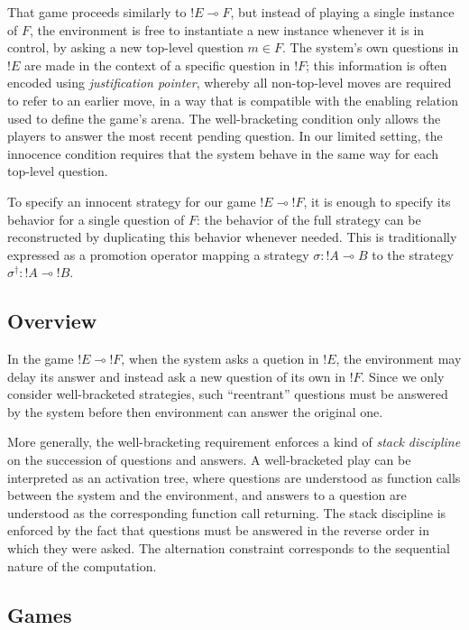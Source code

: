 \documentclass[format=sigplan,authordraft]{acmart}
\begin{document}
That game proceeds similarly to ${!E} \multimap F$,
but instead of playing a single instance of $F$,
the environment is free to instantiate a new instance
whenever it is in control,
by asking a new top-level question $m \in F$.
The system's own questions in ${!E}$
are made in the context of a specific question in ${!F}$;
this information is often encoded using \emph{justification pointer},
whereby all non-top-level moves are required to refer to
an earlier move,
in a way that is compatible with the enabling relation
used to define the game's arena.
The well-bracketing condition only allows the players
to answer the most recent pending question.
In our limited setting,
the innocence condition requires that the system
behave in the same way for each top-level question.

To specify an innocent strategy
for our game ${!E} \multimap {!F}$,
it is enough to specify its behavior
for a single question of $F$:
the behavior of the full strategy can be reconstructed
by duplicating this behavior whenever needed.
This is traditionally expressed as a promotion operator
mapping a strategy $\sigma : {!A} \multimap B$
to the strategy $\sigma^\dagger : {!A} \multimap {!B}$.


\subsection{Overview} %
\label{sec:arrow}

In the game ${!E} \multimap {!F}$,
when the system asks a quetion in ${!E}$,
the environment may delay its answer
and instead ask a new question of its own in ${!F}$.
Since we only consider well-bracketed strategies,
such ``reentrant'' questions must be answered by the system
before then environment can answer the original one.

More generally,
the well-bracketing requirement
enforces a kind of \emph{stack discipline}
on the succession of questions and answers.
A well-bracketed play
can be interpreted as an activation tree,
where questions are understood as function calls
between the system and the environment,
and answers to a question are understood as the
corresponding function call returning.
The stack discipline is enforced by the fact that
questions must be answered in the reverse order
in which they were asked.
The alternation constraint
corresponds to the sequential nature of the computation.


\subsection{Games} %
\end{document}
